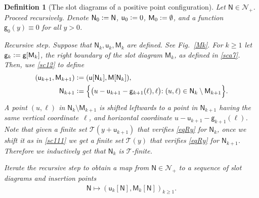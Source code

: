 \documentclass[12pt]{article}
\numberwithin{equation}{section}
\newtheorem{definition}[theorem]{Definition}
\newcommand{\cN}{\mathcal N}
\newcommand{\sM}{\mathsf{M}}
\newcommand{\sN}{\mathsf{N}}
\newcommand{\sg}{\mathsf{g}}
\newcommand{\su}{{\mathsf{u}}}
\begin{document}
\begin{definition}
  [The slot diagrams of a positive point configuration]\label{d1}
 \rm  Let $\sN\in\cN_+$. Proceed recursively. Denote $\sN_0 \vcentcolon =\sN$, $\su_0\vcentcolon = 0$, $\sM_0\vcentcolon = \emptyset$, and a function $\sg_0(y) \equiv 0$ for all $y> 0$. 

Recursive step. Suppose that $\sN_{k},\su_{k},\sM_{k}$ are defined.
See Fig.~\ref{Mk}.
 For $k\ge1$ let $\sg_k\vcentcolon =\sg[\sM_k]$,  the right boundary of the slot diagram $\sM_k$, as defined in \eqref{sca7}. Then, use \eqref{sc12} to define
\begin{align}
 (\su_{k+1}, \sM_{k+1})&\vcentcolon = (\su[\sN_{k}], \sM[\sN_{k}]), \label{an1} \\
 \sN_{k+1} &\vcentcolon = \Bigl\{\bigl(u-\su_{k+1}-\sg_{k+1}(\ell), \ell\bigl):(u, \ell)\in\sN_{k}\setminus\sM_{k+1}\Bigr\}. \label{sc111}
\end{align}
A point $(u,\ell)$ in $\sN_{k}\setminus\sM_{k+1}$ is shifted leftwards to a point in $\sN_{k+1}$ having the same vertical coordinate~$\ell$, and horizontal coordinate $u-\su_{k+1}-\sg_{k+1}(\ell)$. 
Note that given a finite set $\mathcal T(y+\su_{k+1})$ that verifies \eqref{eqRy} for $\sN_{k}$, once we shift it as in \eqref{sc111} we get a finite set $\mathcal T(y)$ that verifies \eqref{eqRy} for $\sN_{k+1}$.
Therefore we inductively get that $\sN_{k}$ is $\mathcal T$-finite.


Iterate the recursive step to obtain a map from $\sN\in \cN_+$ to a sequence of slot diagrams and insertion points 
\begin{align}
  \sN\mapsto  (\su_k[\sN], \sM_k[\sN])_{k\ge 1}.\label{250}
\end{align}
\end{definition}
\end{document}
